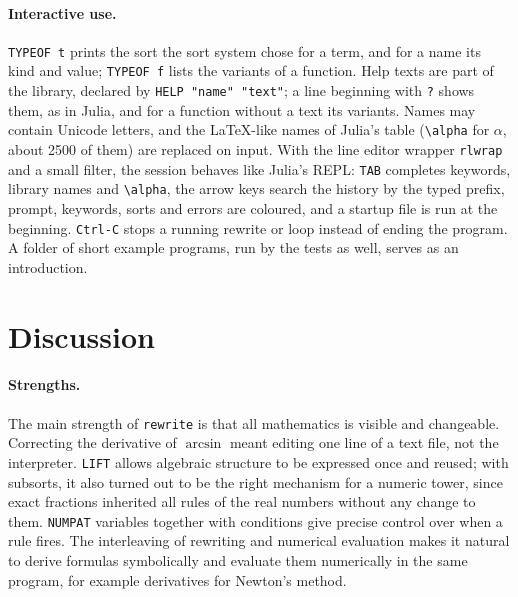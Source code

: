 \documentclass[11pt,a4paper]{article}
\begin{document}
\paragraph{Interactive use.} \texttt{TYPEOF t} prints the sort the sort
system chose for a term, and for a name its kind and value; \texttt{TYPEOF
f} lists the variants of a function. Help texts are part of the library,
declared by \texttt{HELP "name" "text"}; a line beginning with \texttt{?}
shows them, as in Julia, and for a function without a text its variants.
Names may contain Unicode letters, and the LaTeX-like names of Julia's
table (\verb|\alpha| for $\alpha$, about 2500 of them) are replaced on
input. With the line editor wrapper \texttt{rlwrap} and a small filter,
the session behaves like Julia's REPL: \texttt{TAB} completes keywords,
library names and \verb|\alpha|, the arrow keys search the history by the
typed prefix, prompt, keywords, sorts and errors are coloured, and a
startup file is run at the beginning. \texttt{Ctrl-C} stops a running
rewrite or loop instead of ending the program. A folder of short example
programs, run by the tests as well, serves as an introduction.

\section{Discussion}

\paragraph{Strengths.} The main strength of \texttt{rewrite} is that all
mathematics is visible and changeable. Correcting the derivative of
$\arcsin$ meant editing one line of a text file, not the interpreter.
\texttt{LIFT} allows algebraic structure to be expressed once and reused;
with subsorts, it also turned out to be the right mechanism for a numeric
tower, since exact fractions inherited all rules of the real numbers
without any change to them. \texttt{NUMPAT} variables together with conditions
give precise control over when a rule fires. The interleaving of rewriting
and numerical evaluation makes it natural to derive formulas symbolically
and evaluate them numerically in the same program, for example derivatives
for Newton's method.
\end{document}
